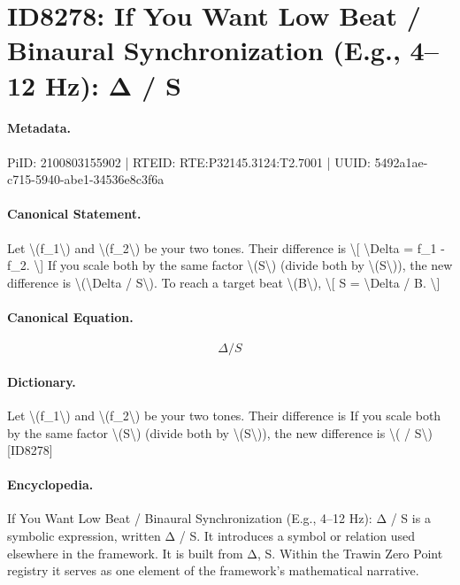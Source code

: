 \section*{ID8278: If You Want Low Beat / Binaural Synchronization (E.g., 4–12 Hz): Δ / S}
\paragraph{Metadata.}
PiID: 2100803155902 | RTEID: RTE:P32145.3124:T2.7001 | UUID: 5492a1ae-c715-5940-abe1-34536e8c3f6a

\paragraph{Canonical Statement.}
Let \textbackslash{}(f\_1\textbackslash{}) and \textbackslash{}(f\_2\textbackslash{}) be your two tones. Their difference is \textbackslash{}[ \textbackslash{}Delta = f\_1 - f\_2. \textbackslash{}] If you scale both by the same factor \textbackslash{}(S\textbackslash{}) (divide both by \textbackslash{}(S\textbackslash{})), the new difference is \textbackslash{}(\textbackslash{}Delta / S\textbackslash{}). To reach a target beat \textbackslash{}(B\textbackslash{}), \textbackslash{}[ S = \textbackslash{}Delta / B. \textbackslash{}]

\paragraph{Canonical Equation.}
\[
\Delta / S
\]

\paragraph{Dictionary.}
Let \textbackslash{}(f\_1\textbackslash{}) and \textbackslash{}(f\_2\textbackslash{}) be your two tones. Their difference is If you scale both by the same factor \textbackslash{}(S\textbackslash{}) (divide both by \textbackslash{}(S\textbackslash{})), the new difference is \textbackslash{}( / S\textbackslash{}) [ID8278]

\paragraph{Encyclopedia.}
If You Want Low Beat / Binaural Synchronization (E.g., 4–12 Hz): Δ / S is a symbolic expression, written Δ / S. It introduces a symbol or relation used elsewhere in the framework. It is built from Δ, S. Within the Trawin Zero Point registry it serves as one element of the framework's mathematical narrative.
